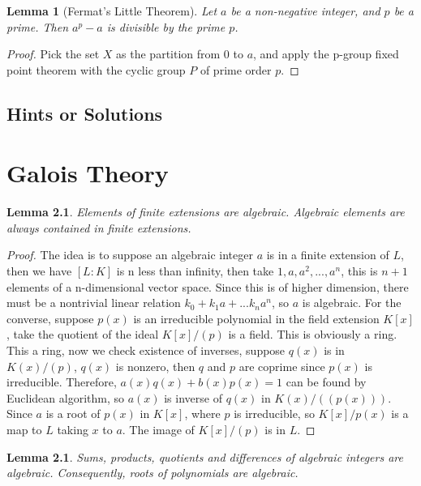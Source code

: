 \documentclass{tufte-book}
\newtheorem{lemma}[theorem]{Lemma}
\begin{document}
\begin{lemma}[Fermat's Little Theorem]
  Let $a$ be a non-negative integer, and $p$ be a prime.
  Then $a^p - a$ is divisible by the prime $p$. 
\end{lemma}

\begin{proof}
  Pick the set $X$ as the partition from $0$ to $a$, and apply the p-group fixed point theorem with the cyclic group $P$ of prime order $p$.
\end{proof}

\section{Hints or Solutions}

\chapter{Galois Theory}

\begin{lemma}
    Elements of finite extensions are algebraic. Algebraic elements are always contained in finite extensions.
\end{lemma}

\begin{proof}
The idea is to suppose an algebraic integer $a$ is in a finite extension of $L$, then we have $[L:K]$ is n less than infinity, then take $1, a, a^2, ..., a^n$, this is $n + 1$ elements of a n-dimensional vector space. Since this is of higher dimension, there must be a nontrivial linear relation $k_0 + k_1 a + ... k_n a^n$, so $a$ is algebraic. For the converse, suppose $p(x)$ is an irreducible polynomial in the field extension $K[x]$, take the quotient of the ideal $K[x]/(p)$ is a field. This is obviously a ring. This a ring, now we check existence of inverses, suppose $q(x)$ is in $K(x)/(p)$, $q(x)$ is nonzero, then $q$ and $p$ are coprime since $p(x)$ is irreducible. Therefore, $a(x)q(x) + b(x) p(x) = 1$ can be found by Euclidean algorithm, so $a(x)$ is inverse of $q(x)$ in $K(x)/((p(x)))$. Since $a$ is a root of $p(x)$ in $K[x]$, where $p$ is irreducible, so $K[x]/p(x)$ is a map to $L$ taking $x$ to $a$. The image of $K[x]/(p)$ is in $L$.
\end{proof}

\begin{lemma}
    Sums, products, quotients and differences of algebraic integers are algebraic. Consequently, roots of polynomials are algebraic.
\end{lemma}
\end{document}
